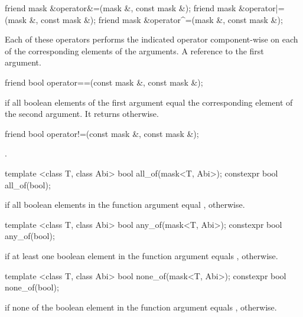 \begin{itemdecl}
friend mask &operator&=(mask &, const mask &);
friend mask &operator|=(mask &, const mask &);
friend mask &operator^=(mask &, const mask &);
\end{itemdecl}
\begin{itemdescr}
  \pnum\effects Each of these operators performs the indicated operator component-wise on each of the corresponding elements of the arguments.
  \pnum\returns A reference to the first argument.
\end{itemdescr}

\begin{itemdecl}
friend bool operator==(const mask &, const mask &);
\end{itemdecl}
\begin{itemdescr}
  \pnum\returns \true if all boolean elements of the first argument equal the corresponding element of the second argument.
  It returns \false otherwise.
\end{itemdescr}

\begin{itemdecl}
friend bool operator!=(const mask &, const mask &);
\end{itemdecl}
\begin{itemdescr}
  \pnum\returns {}.
\end{itemdescr}

\begin{itemdecl}
template <class T, class Abi> bool  all_of(mask<T, Abi>);
constexpr bool  all_of(bool);
\end{itemdecl}
\begin{itemdescr}
  \pnum\returns \true if all boolean elements in the function argument equal \true, \false otherwise.
\end{itemdescr}

\begin{itemdecl}
template <class T, class Abi> bool  any_of(mask<T, Abi>);
constexpr bool  any_of(bool);
\end{itemdecl}
\begin{itemdescr}
  \pnum\returns \true if at least one boolean element in the function argument equals \true, \false otherwise.
\end{itemdescr}

\begin{itemdecl}
template <class T, class Abi> bool none_of(mask<T, Abi>);
constexpr bool none_of(bool);
\end{itemdecl}
\begin{itemdescr}
  \pnum\returns \true if none of the boolean element in the function argument equals \true, \false otherwise.
\end{itemdescr}

